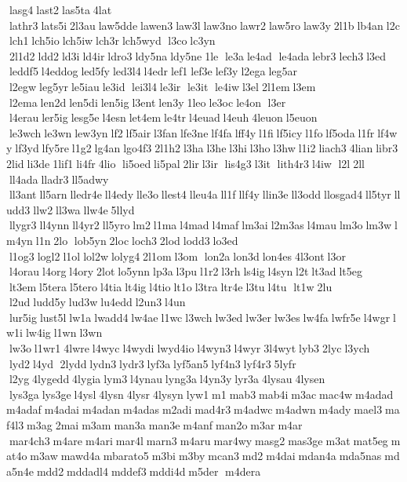  lasg4 last2 las5ta 4lat  lathr3 lats5i 2l3au law5dde lawen3 law3l law3no lawr2 law5ro law3y 2l1b lb4an l2c lch1 lch5io lch5iw lch3r lch5wyd  l3co lc3yn  2l1d2 ldd2 ld3i ld4ir ldro3 ldy5na ldy5ne 1le  le3a le4ad  le4ada lebr3 lech3 l3ed  leddf5 l4eddog led5fy led3l4 l4edr lef1 lef3e lef3y l2ega leg5ar  l2egw leg5yr le5iau le3id  lei3l4 le3ir  le3it  le4iw l3el 2l1em l3em  l2ema len2d len5di len5ig l3ent len3y 1leo le3oc le4on  l3er  l4erau ler5ig lesg5e l4esn let4em le4tr l4euad l4euh 4leuon l5euon  le3wch le3wn lew3yn lf2 lf5air l3fan lfe3ne lf4fa lff4y l1fi lf5icy l1fo lf5oda l1fr lf4wy lf3yd lfy5re l1g2 lg4an lgo4f3 2l1h2 l3ha l3he l3hi l3ho l3hw l1i2 liach3 4lian libr3 2lid li3de 1lif1 li4fr 4lio  li5oed li5pal 2lir l3ir  lis4g3 l3it  lith4r3 l4iw  l2l 2ll  ll4ada lladr3 ll5adwy  ll3ant ll5arn lledr4e ll4edy lle3o llest4 lleu4a ll1f llf4y llin3e ll3odd llosgad4 ll5tyr lludd3 llw2 ll3wa llw4e 5llyd  llygr3 ll4ynn ll4yr2 ll5yro lm2 l1ma l4mad l4maf lm3ai l2m3as l4mau lm3o lm3w lm4yn l1n 2lo  lob5yn 2loc loch3 2lod lodd3 lo3ed  l1og3 logl2 l1ol lol2w lolyg4 2l1om l3om  lon2a lon3d lon4es 4l3ont l3or  l4orau l4org l4ory 2lot lo5ynn lp3a l3pu l1r2 l3rh ls4ig l4syn l2t lt3ad lt5eg  lt3em l5tera l5tero l4tia lt4ig l4tio lt1o l3tra ltr4e l3tu l4tu  lt1w 2lu  l2ud ludd5y lud3w lu4edd l2un3 l4un  lur5ig lust5l lw1a lwadd4 lw4ae l1wc l3wch lw3ed lw3er lw3es lw4fa lwfr5e l4wgr lw1i lw4ig l1wn l3wn  lw3o l1wr1 4lwre l4wyc l4wydi lwyd4io l4wyn3 l4wyr 3l4wyt lyb3 2lyc l3ych  lyd2 l4yd  2lydd lydn3 lydr3 lyf3a lyf5an5 lyf4n3 lyf4r3 5lyfr  l2yg 4lygedd 4lygia lym3 l4ynau lyng3a l4yn3y lyr3a 4lysau 4lysen  lys3ga lys3ge l4ysl 4lysn 4lysr 4lysyn lyw1 m1 mab3 mab4i m3ac mac4w m4adad m4adaf m4adai m4adan m4adas m2adi mad4r3 m4adwc m4adwn m4ady mael3 maf4l3 m3ag 2mai m3am man3a man3e m4anf man2o m3ar m4ar  mar4ch3 m4are m4ari mar4l marn3 m4aru mar4wy masg2 mas3ge m3at mat5eg mat4o m3aw mawd4a mbarato5 m3bi m3by mcan3 md2 m4dai mdan4a mda5nas mda5n4e mdd2 mddadl4 mddef3 mddi4d m5der  m4dera 

